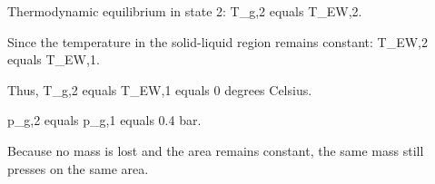 Thermodynamic equilibrium in state 2:  
T_g,2 equals T_EW,2.  

Since the temperature in the solid-liquid region remains constant:  
T_EW,2 equals T_EW,1.  

Thus, T_g,2 equals T_EW,1 equals 0 degrees Celsius.  

p_g,2 equals p_g,1 equals 0.4 bar.  

Because no mass is lost and the area remains constant, the same mass still presses on the same area.